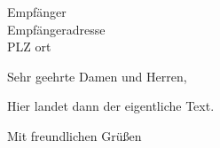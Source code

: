 \documentclass[
	ngerman,%
	]{scrartcl}
\begin{document}
	

	
\begin{letter}{Empfänger\\Empfängeradresse\\PLZ ort}
	

	
\opening{Sehr geehrte Damen und Herren,}%

Hier landet dann der eigentliche Text.

\closing{Mit freundlichen Grüßen}




	
\end{letter}
\end{document}
